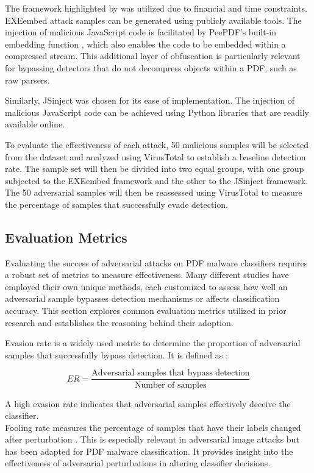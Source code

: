 \documentclass[10pt,twocolumn]{article}
\begin{document}
The framework highlighted by \textcite{Maiorca2013} was utilized due to financial and time constraints. EXEembed attack samples can be generated using publicly available tools. The injection of malicious JavaScript code is facilitated by PeePDF’s built-in embedding function \cite{PeePDF}, which also enables the code to be embedded within a compressed stream. This additional layer of obfuscation is particularly relevant for bypassing detectors that do not decompress objects within a PDF, such as raw parsers.

Similarly, JSinject was chosen for its ease of implementation. The injection of malicious JavaScript code can be achieved using Python libraries \cite{RSMBlog}that are readily available online.

To evaluate the effectiveness of each attack, 50 malicious samples will be selected from the dataset and analyzed using VirusTotal to establish a baseline detection rate. The sample set will then be divided into two equal groups, with one group subjected to the EXEembed framework and the other to the JSinject framework. The 50 adversarial samples will then be reassessed using VirusTotal to measure the percentage of samples that successfully evade detection.




\subsection{Evaluation Metrics}

Evaluating the success of adversarial attacks on PDF malware classifiers requires a robust set of metrics to measure effectiveness. Many different studies have employed their own unique methods, each customized to assess how well an adversarial sample bypasses detection mechanisms or affects classification accuracy. This section explores common evaluation metrics utilized in prior research and establishes the reasoning behind their adoption.

Evasion rate is a widely used metric to determine the proportion of adversarial samples that successfully bypass detection. It is defined as \cite{Rando2024}:

\[
ER = \frac{\text{Adversarial samples that bypass detection}}{\text{Number of samples}}
\]


A high evasion rate indicates that adversarial samples effectively deceive the classifier. \\

Fooling rate measures the percentage of samples that have their labels changed after perturbation \cite{Huan2020}. This is especially relevant in adversarial image attacks but has been adapted for PDF malware classification. It provides insight into the effectiveness of adversarial perturbations in altering classifier decisions.
\end{document}

